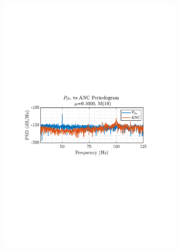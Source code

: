 \documentclass[12pt]{article}
\begin{document}
\begin{figure}[H]
				\begin{subfigure}{0.49\textwidth}
					\centering
					\includegraphics[trim={2.2cm 11.2cm 3.15cm  11.2cm}, clip, width=\textwidth]{../MATLAB/figures/q2_3d_fig04.pdf} 
					\captionsetup{justification=centering}
				\end{subfigure}
				\begin{subfigure}{0.49\textwidth}
					\centering

\end{subfigure}
\end{figure}
\end{document}
